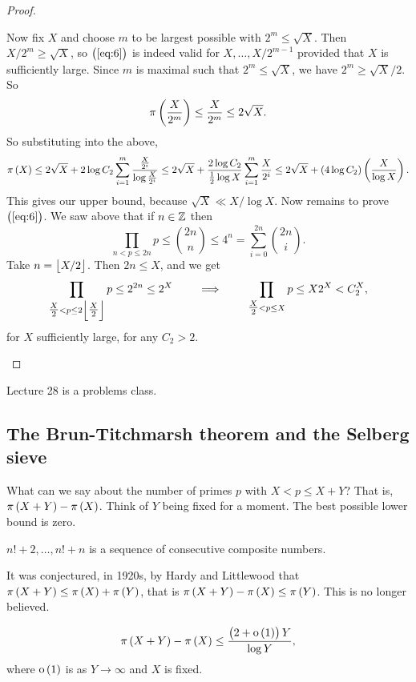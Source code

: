 \begin{proof}
\begin{itemize}
\pagebreak

Now fix $ X $ and choose $ m $ to be largest possible with $ 2^m \le \sqrt{X} $. Then $ X / 2^m \ge \sqrt{X} $, so $ \br{\ref{eq:6}} $ is indeed valid for $ X, \dots, X / 2^{m - 1} $ provided that $ X $ is sufficiently large. Since $ m $ is maximal such that $ 2^m \le \sqrt{X} $, we have $ 2^m \ge \sqrt{X} / 2 $. So
$$ \pi\br{\dfrac{X}{2^m}} \le \dfrac{X}{2^m} \le 2\sqrt{X}. $$
So substituting into the above,
$$ \pi\br{X} \le 2\sqrt{X} + 2\log C_2\sum_{i = 1}^m \dfrac{\tfrac{X}{2^i}}{\log \tfrac{X}{2^i}} \le 2\sqrt{X} + \dfrac{2\log C_2}{\tfrac{1}{2}\log X}\sum_{i = 1}^m \dfrac{X}{2^i} \le 2\sqrt{X} + \br{4\log C_2}\br{\dfrac{X}{\log X}}. $$
This gives our upper bound, because $ \sqrt{X} \ll X / \log X $. Now remains to prove $ \br{\ref{eq:6}} $. We saw above that if $ n \in \mathbb{Z} $ then
$$ \prod_{n < p \le 2n} p \le \binom{2n}{n} \le 4^n = \sum_{i = 0}^{2n} \binom{2n}{i}. $$
Take $ n = \left\lfloor X / 2 \right\rfloor $. Then $ 2n \le X $, and we get
$$ \prod_{\tfrac{X}{2} < p \le 2\left\lfloor \tfrac{X}{2} \right\rfloor} p \le 2^{2n} \le 2^X \qquad \implies \qquad \prod_{\tfrac{X}{2} < p \le X} p \le X2^X < C_2^X, $$
for $ X $ sufficiently large, for any $ C_2 > 2 $.
\end{itemize}
\end{proof}


Lecture 28 is a problems class.

\subsection{The Brun-Titchmarsh theorem and the Selberg sieve}


What can we say about the number of primes $ p $ with $ X < p \le X + Y $? That is, $ \pi\br{X + Y} - \pi\br{X} $. Think of $ Y $ being fixed for a moment. The best possible lower bound is zero.

\begin{example*}
$ n! + 2, \dots, n! + n $ is a sequence of consecutive composite numbers.
\end{example*}

It was conjectured, in 1920s, by Hardy and Littlewood that $ \pi\br{X + Y} \le \pi\br{X} + \pi\br{Y} $, that is $ \pi\br{X + Y} - \pi\br{X} \le \pi\br{Y} $. This is no longer believed.

\begin{theorem}
\label{thm:107}
$$ \pi\br{X + Y} - \pi\br{X} \le \dfrac{\br{2 + \o\br{1}}Y}{\log Y}, $$
where $ \o\br{1} $ is as $ Y \to \infty $ and $ X $ is fixed.
\end{theorem}

